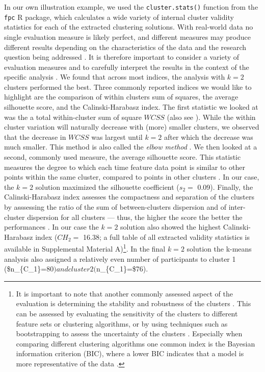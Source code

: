 In our own illustration example, we used the \texttt{cluster.stats()}
function from the \texttt{fpc} \textsf{R} package, which calculates a
wide variety of internal cluster validity statistics for each of the
extracted clustering solutions. With real-world data no single
evaluation measure is likely perfect, and different measures may produce
different results depending on the characteristics of the data and the
research question being addressed \citep{kittler1998}. It is therefore
important to consider a variety of evaluation measures and to carefully
interpret the results in the context of the specific analysis
\citep{vinh2009}. We found that across most indices, the analysis with
\(k=2\) clusters performed the best. Three commonly reported indices we
would like to highlight are the comparison of within clusters sum of
squares, the average silhouette score, and the Calinski-Harabasz index.
The first statistic we looked at was the a total within-cluster sum of
square \(WCSS\) (also see ). While the within cluster
variation will naturally decrease with (more) smaller clusters, we
observed that the decrease in \(WCSS\) was largest until \(k=2\) after
which the decrease was much smaller. This method is also called the
\textit{elbow method} \citep{syakur2018}. We then looked at a second,
commonly used measure, the average silhouette score. This statistic
measures the degree to which each time feature data point is similar to
other points within the same cluster, compared to points in other
clusters \citep{rousseeuw1987}. In our case, the \(k=2\) solution
maximized the silhouette coefficient (\(s_2=\) 0.09). Finally, the
Calinski-Harabasz index assesses the compactness and separation of the
clusters by asssessing the ratio of the sum of between-clusters
dispersion and of inter-cluster dispersion for all clusters --- thus,
the higher the score the better the performances \citep{calinski1974}.
In our case the \(k=2\) solution also showed the highest
Calinski-Harabasz index (\(CH_2=\) 16.38; a full table of all extracted
validity statistics is available in Supplemental Material
A)\footnote{It is important to note that another commonly assessed aspect of the evaluation is determining the stability and robustness of the clusters \citep{berkhin2006}. This can be assessed by evaluating the sensitivity of the clusters to different feature sets or clustering algorithms, or by using techniques such as bootstrapping to assess the uncertainty of the clusters \citep{vinh2009}. Especially when comparing different clustering algorithms one common index is the Bayesian information criterion (BIC), where a lower BIC indicates that a model is more representative of the data \citep{vandeschoot2017}.}.
In the final \(k=2\) solution the k-means analysis also assigned a
relatively even number of participants to cluster 1
(\$n\_\{C\_1\}=\(80) and cluster 2 (\)n\_\{C\_1\}=\$76).
